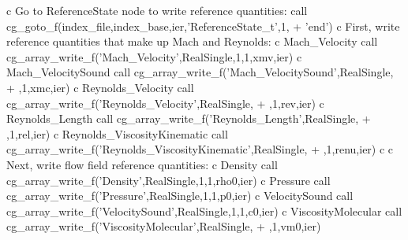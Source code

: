 \documentclass[12pt]{article}
\begin{document}
{\newline c   Go to ReferenceState node to write reference quantities:
\newline\indent      call cg\_goto\_f(index\_file,index\_base,ier,'ReferenceState\_t',1,
\newline + \indent  'end')
\newline c   First, write reference quantities that make up Mach and Reynolds:
\newline c   Mach\_Velocity
\newline\indent      call cg\_array\_write\_f('Mach\_Velocity',RealSingle,1,1,xmv,ier)
\newline c   Mach\_VelocitySound
\newline\indent      call cg\_array\_write\_f('Mach\_VelocitySound',RealSingle,
\newline + ,1,xmc,ier)
\newline c   Reynolds\_Velocity
\newline\indent      call cg\_array\_write\_f('Reynolds\_Velocity',RealSingle,
\newline + ,1,rev,ier)
\newline c   Reynolds\_Length
\newline\indent      call cg\_array\_write\_f('Reynolds\_Length',RealSingle,
\newline + ,1,rel,ier)
\newline c   Reynolds\_ViscosityKinematic
\newline\indent      call cg\_array\_write\_f('Reynolds\_ViscosityKinematic',RealSingle,
\newline + ,1,renu,ier)
\newline c
\newline c   Next, write flow field reference quantities:
\newline c   Density
\newline\indent      call cg\_array\_write\_f('Density',RealSingle,1,1,rho0,ier)
\newline c   Pressure
\newline\indent      call cg\_array\_write\_f('Pressure',RealSingle,1,1,p0,ier)
\newline c   VelocitySound
\newline\indent      call cg\_array\_write\_f('VelocitySound',RealSingle,1,1,c0,ier)
\newline c   ViscosityMolecular
\newline\indent      call cg\_array\_write\_f('ViscosityMolecular',RealSingle,
\newline + ,1,vm0,ier)
}
\end{document}
